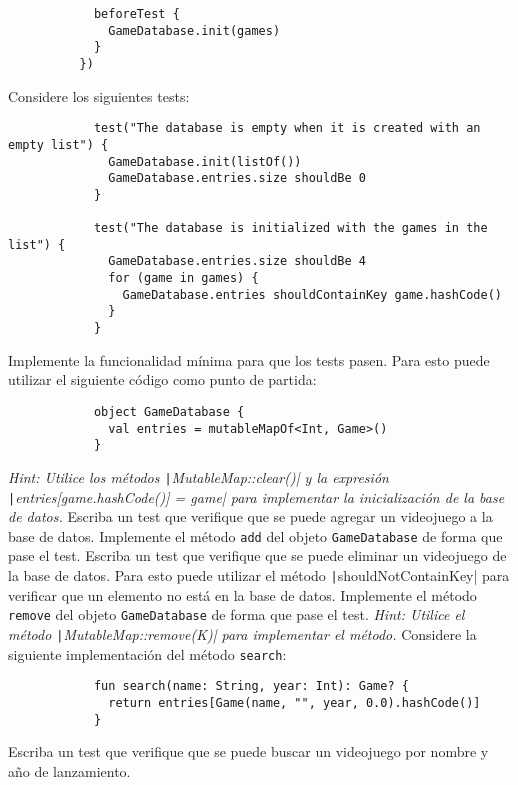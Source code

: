 \begin{Exercise}[title={Bases de datos}]
\begin{verbatim}
            beforeTest {
              GameDatabase.init(games)
            }
          })
        \end{verbatim}
        
        \Question Considere los siguientes tests:
          \begin{verbatim}
            test("The database is empty when it is created with an empty list") {
              GameDatabase.init(listOf())
              GameDatabase.entries.size shouldBe 0
            }

            test("The database is initialized with the games in the list") {
              GameDatabase.entries.size shouldBe 4
              for (game in games) {
                GameDatabase.entries shouldContainKey game.hashCode()
              }
            }
          \end{verbatim}
          Implemente la funcionalidad mínima para que los tests pasen.
          Para esto puede utilizar el siguiente código como punto de partida:
          \begin{verbatim}
            object GameDatabase {
              val entries = mutableMapOf<Int, Game>()
            }
          \end{verbatim}
          \textit{Hint: Utilice los métodos \texttt|MutableMap::clear()| y la expresión
          \texttt|entries[game.hashCode()] = game| para implementar la inicialización de 
          la base de datos.}
        \Question Escriba un test que verifique que se puede agregar un videojuego a la base de 
          datos.
        \Question Implemente el método \texttt{add} del objeto \texttt{GameDatabase} de forma que
          pase el test.
        \Question Escriba un test que verifique que se puede eliminar un videojuego de la base de
          datos.
          Para esto puede utilizar el método \texttt|shouldNotContainKey| para verificar
          que un elemento no está en la base de datos.
        \Question Implemente el método \texttt{remove} del objeto \texttt{GameDatabase} de forma
          que pase el test.
          \textit{Hint: Utilice el método \texttt|MutableMap::remove(K)| para implementar
          el método.}
        \Question Considere la siguiente implementación del método \texttt{search}:
          \begin{verbatim}
            fun search(name: String, year: Int): Game? {
              return entries[Game(name, "", year, 0.0).hashCode()]
            }
          \end{verbatim}
          Escriba un test que verifique que se puede buscar un videojuego por nombre y año de
          lanzamiento.
  \end{Exercise}